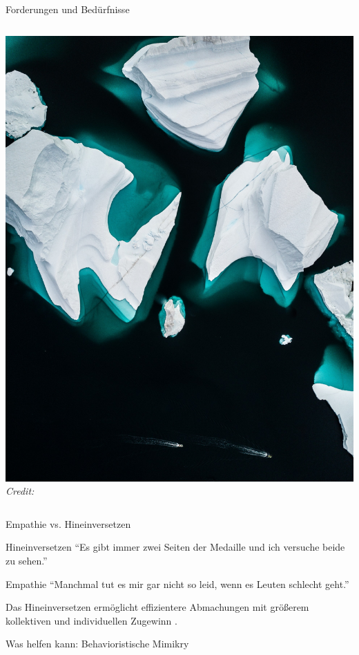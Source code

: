 \begin{frame}{Forderungen und Bedürfnisse}
\begin{columns}[c]
    \begin{column}{.35\textwidth}
      \includegraphics[width=\textwidth]{content/fig/eisberg.jpg}
      {\hspace*{15pt}\hbox{\scriptsize\itshape Credit:}}
    \end{column}
  \end{columns}

\end{frame}

\begin{frame}{Empathie vs. Hineinversetzen}

  \begin{block}{Hineinversetzen}
    \enquote{Es gibt immer zwei Seiten der Medaille und ich versuche beide zu sehen.}
  \end{block}
  \begin{block}{Empathie}
    \enquote{Manchmal tut es mir gar nicht so leid, wenn es Leuten schlecht geht.}
  \end{block}

  Das Hineinversetzen ermöglicht effizientere Abmachungen mit größerem kollektiven und individuellen Zugewinn \cite{galinsky_why_2008}.

  Was helfen kann: Behavioristische Mimikry \cite[][p. 500]{thompson_negotiation_2010}
\end{frame}

